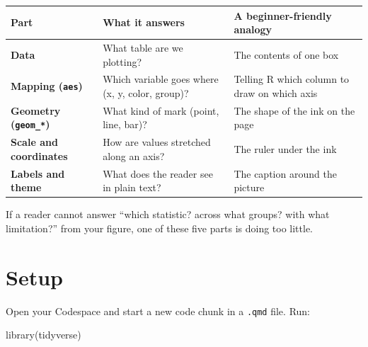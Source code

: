 \documentclass[
  letterpaper,
  DIV=11,
  numbers=noendperiod,
  oneside]{scrreprt}
\newenvironment{Shaded}{\begin{snugshade}}{\end{snugshade}}
\newcommand{\FunctionTok}[1]{\textcolor[rgb]{0.28,0.35,0.67}{#1}}
\newcommand{\NormalTok}[1]{\textcolor[rgb]{0.00,0.23,0.31}{#1}}
\begin{document}
\begin{longtable}[]{@{}
  >{\raggedright\arraybackslash}p{}
  >{\raggedright\arraybackslash}p{}
  >{\raggedright\arraybackslash}p{}@{}}
\toprule\noalign{}
\begin{minipage}[b]{\linewidth}\raggedright
Part
\end{minipage} & \begin{minipage}[b]{\linewidth}\raggedright
What it answers
\end{minipage} & \begin{minipage}[b]{\linewidth}\raggedright
A beginner-friendly analogy
\end{minipage} \\
\midrule\noalign{}
\endhead
\bottomrule\noalign{}
\endlastfoot
\textbf{Data} & What table are we plotting? & The contents of one box \\
\textbf{Mapping (\texttt{aes})} & Which variable goes where (x, y,
color, group)? & Telling R which column to draw on which axis \\
\textbf{Geometry (\texttt{geom\_*})} & What kind of mark (point, line,
bar)? & The shape of the ink on the page \\
\textbf{Scale and coordinates} & How are values stretched along an axis?
& The ruler under the ink \\
\textbf{Labels and theme} & What does the reader see in plain text? &
The caption around the picture \\
\end{longtable}

If a reader cannot answer ``which statistic? across what groups? with
what limitation?'' from your figure, one of these five parts is doing
too little.

\section*{Setup}\label{setup}


Open your Codespace and start a new code chunk in a \texttt{.qmd} file.
Run:

\begin{Shaded}
\begin{Highlighting}[numbers=left,,]
\FunctionTok{library}\NormalTok{(tidyverse)}
\end{Highlighting}
\end{Shaded}
\end{document}
